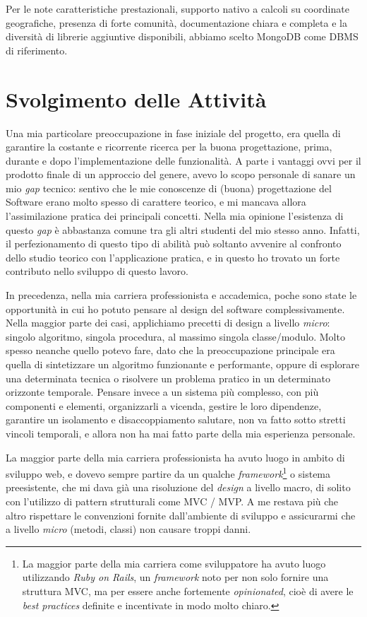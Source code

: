 \documentclass[12pt]{report}
\begin{document}
Per le note caratteristiche prestazionali, supporto nativo a calcoli
su coordinate geografiche, presenza di forte comunità, documentazione
chiara e completa e la diversità di librerie aggiuntive disponibili,
abbiamo scelto MongoDB come DBMS di riferimento.

% 
% 
\chapter{Svolgimento delle Attività}
\label{cap3}

Una mia particolare preoccupazione in fase iniziale del progetto, era
quella di garantire la costante e ricorrente ricerca per la buona
progettazione, prima, durante e dopo l'implementazione delle
funzionalità. A parte i vantaggi ovvi per il prodotto finale di un
approccio del genere, avevo lo scopo personale di sanare un mio
\textit{gap} tecnico: sentivo che le mie conoscenze di (buona)
progettazione del Software erano molto spesso di carattere teorico, e
mi mancava allora l'assimilazione pratica dei principali concetti. Nella mia
opinione l'esistenza di questo \textit{gap} è abbastanza comune tra gli altri
studenti del mio stesso anno. Infatti, il perfezionamento di questo tipo di
abilità può soltanto avvenire al confronto dello studio teorico con
l'applicazione pratica, e in questo ho trovato un forte contributo nello
sviluppo di questo lavoro.

In precedenza, nella mia carriera professionista e accademica, poche
sono state le opportunità in cui ho potuto pensare al design del
software complessivamente. Nella maggior parte dei casi, applichiamo
precetti di design a livello \textit{micro}: singolo algoritmo,
singola procedura, al massimo singola classe/modulo. Molto spesso
neanche quello potevo fare, dato che la preoccupazione principale era
quella di sintetizzare un algoritmo funzionante e performante, oppure
di esplorare una determinata tecnica o risolvere un problema pratico in un
determinato orizzonte temporale. Pensare invece a un sistema più complesso,
con più componenti e elementi, organizzarli a vicenda, gestire le loro
dipendenze, garantire un isolamento e disaccoppiamento salutare, non va fatto
sotto stretti vincoli temporali, e allora non ha mai fatto parte della mia
esperienza personale. 

La maggior parte della mia carriera professionista ha avuto luogo in
ambito di sviluppo web, e dovevo sempre partire da un qualche
\textit{framework}\footnote{
La maggior parte della mia carriera come sviluppatore ha avuto luogo
utilizzando \textit{Ruby on Rails}, un \textit{framework} noto per non
solo fornire una struttura MVC, ma per essere anche fortemente
\textit{opinionated}, cioè di avere le \textit{best practices}
definite e incentivate in modo molto chiaro.} 
o sistema preesistente, che mi dava già una risoluzione del \textit{design} a
livello macro, di solito con l'utilizzo di pattern strutturali come MVC / MVP.
A me restava più che altro rispettare le convenzioni fornite dall'ambiente di
sviluppo e assicurarmi che a livello \textit{micro} (metodi, classi) non
causare troppi danni.
\end{document}
